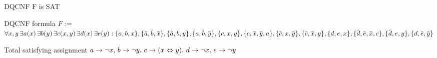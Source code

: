 \documentclass[xcolor=table	]{beamer}
\newcommand{\ov}[1]{\mkern 1.5mu\overline{\mkern-1.5mu#1\mkern-1.5mu}\mkern 1.5mu}
\begin{document}
\begin{frame}{DQCNF F is SAT}
\begin{alertblock}{DQCNF formula} {
			$F$ :=	$ \forall x, y \, \exists a(x) \, \exists  b(y) \, \exists c(x,y) \, \exists d(x) \, \exists e(y) :
			\{a,b,x\}, \{\ov{a},\ov{b},\ov{x}\}, \{\ov{a},b,y\}, \{a,\ov{b},\ov{y}\},  \newline 
			\{c,x,y\}, \{c,\ov{x},\ov{y}, a\}, \{\ov{c},x,\ov{y}\}, \{\ov{c},\ov{x},y\}, \newline 
			\{d,e,x\}, \{\ov{d},\ov{e},\ov{x}, c\}, \{\ov{d},e,y\}, \{d,\ov{e},\ov{y}\} $
		}
\end{alertblock}
\pause 
	\begin{exampleblock}{Total satisfying assignment} {
			$ a \to \neg x, \, b \to \neg y, \, c \to (x \Leftrightarrow  y), \, d \to \neg x, \, e \to \neg y \newline $
		}
    \end{exampleblock} 
\end{frame}

%
%
%
%

%
% 
% 
%
% 
\end{document}
